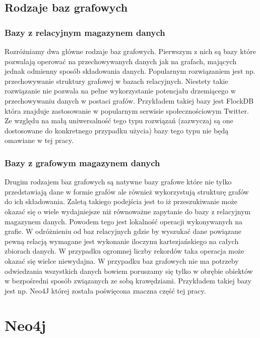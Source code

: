 \documentclass[brudnopis]{xmgr}
\begin{document}
\section{Rodzaje baz grafowych}

\subsection{Bazy z relacyjnym magazynem danych}

Rozróżniamy dwa główne rodzaje baz grafowych. Pierwszym z nich są bazy które pozwalają operować na przechowywanych danych jak na grafach, mających jednak odmienny sposób składowania danych. Popularnym rozwiązaniem jest np. przechowywanie struktury grafowej w bazach relacyjnych. Niestety takie rozwiązanie nie pozwala na pełne wykorzystanie potencjału drzemiącego w przechowywaniu danych w postaci grafów. Przykładem takiej bazy jest FlockDB która znajduje zastosowanie w popularnym serwisie społecznościowym Twitter. Ze względu na małą uniwersalność tego typu rozwiązań (zazwyczaj są one dostosowane do konkretnego przypadku użycia) bazy tego typu nie będą omawiane w tej pracy.

\subsection{Bazy z grafowym magazynem danych}
Drugim rodzajem baz grafowych są natywne bazy grafowe które nie tylko przedstawiają dane w formie grafów ale również wykorzystują strukturę grafów do ich składowania. Zaletą takiego podejścia jest to iż przeszukiwanie może okazać się o wiele wydajniejsze niż równoważne zapytanie do bazy z relacyjnym magazynem danych. Powodem tego jest lokalność operacji wykonywanych na grafie. W odróżnieniu od baz relacyjnych gdzie by wyszukać dane powiązane pewną relacją wymagane jest wykonanie iloczynu kartezjańskiego na całych zbiorach danych. W przypadku ogromnej liczby rekordów taka operacja może okazać się wielce niewydajna. W przypadku baz grafowych nie ma potrzeby odwiedzania wszystkich danych bowiem poruszamy się tylko w obrębie obiektów w bezpośredni sposób związanych ze sobą krawędziami. Przykładem takiej bazy jest np. Neo4J której została poświęcona znaczna część tej pracy.

\chapter{Neo4j}
\end{document}
